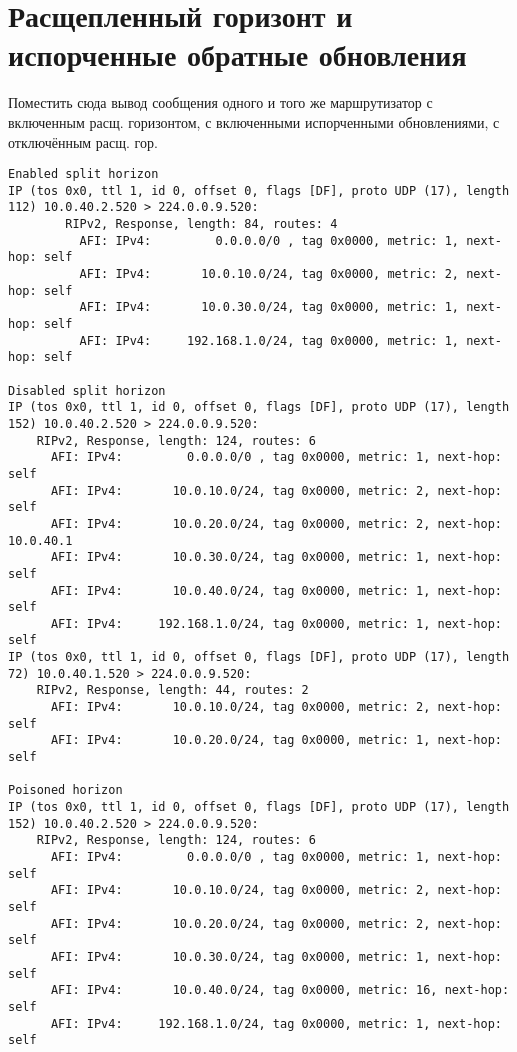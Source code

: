 \documentclass[a4paper,12pt]{article}
\begin{document}
\section{Расщепленный горизонт и испорченные обратные обновления}

Поместить сюда вывод сообщения одного и того же маршрутизатор с включенным расщ. горизонтом, с включенными испорченными обновлениями, с отключённым расщ. гор.
\begin{Verbatim}
Enabled split horizon
IP (tos 0x0, ttl 1, id 0, offset 0, flags [DF], proto UDP (17), length 112) 10.0.40.2.520 > 224.0.0.9.520: 
        RIPv2, Response, length: 84, routes: 4
          AFI: IPv4:         0.0.0.0/0 , tag 0x0000, metric: 1, next-hop: self
          AFI: IPv4:       10.0.10.0/24, tag 0x0000, metric: 2, next-hop: self
          AFI: IPv4:       10.0.30.0/24, tag 0x0000, metric: 1, next-hop: self
          AFI: IPv4:     192.168.1.0/24, tag 0x0000, metric: 1, next-hop: self

Disabled split horizon
IP (tos 0x0, ttl 1, id 0, offset 0, flags [DF], proto UDP (17), length 152) 10.0.40.2.520 > 224.0.0.9.520: 
	RIPv2, Response, length: 124, routes: 6
	  AFI: IPv4:         0.0.0.0/0 , tag 0x0000, metric: 1, next-hop: self
	  AFI: IPv4:       10.0.10.0/24, tag 0x0000, metric: 2, next-hop: self
	  AFI: IPv4:       10.0.20.0/24, tag 0x0000, metric: 2, next-hop: 10.0.40.1
	  AFI: IPv4:       10.0.30.0/24, tag 0x0000, metric: 1, next-hop: self
	  AFI: IPv4:       10.0.40.0/24, tag 0x0000, metric: 1, next-hop: self
	  AFI: IPv4:     192.168.1.0/24, tag 0x0000, metric: 1, next-hop: self
IP (tos 0x0, ttl 1, id 0, offset 0, flags [DF], proto UDP (17), length 72) 10.0.40.1.520 > 224.0.0.9.520: 
	RIPv2, Response, length: 44, routes: 2
	  AFI: IPv4:       10.0.10.0/24, tag 0x0000, metric: 2, next-hop: self
	  AFI: IPv4:       10.0.20.0/24, tag 0x0000, metric: 1, next-hop: self

Poisoned horizon
IP (tos 0x0, ttl 1, id 0, offset 0, flags [DF], proto UDP (17), length 152) 10.0.40.2.520 > 224.0.0.9.520: 
	RIPv2, Response, length: 124, routes: 6
	  AFI: IPv4:         0.0.0.0/0 , tag 0x0000, metric: 1, next-hop: self
	  AFI: IPv4:       10.0.10.0/24, tag 0x0000, metric: 2, next-hop: self
	  AFI: IPv4:       10.0.20.0/24, tag 0x0000, metric: 2, next-hop: self
	  AFI: IPv4:       10.0.30.0/24, tag 0x0000, metric: 1, next-hop: self
	  AFI: IPv4:       10.0.40.0/24, tag 0x0000, metric: 16, next-hop: self
	  AFI: IPv4:     192.168.1.0/24, tag 0x0000, metric: 1, next-hop: self
\end{Verbatim}
\end{document}
